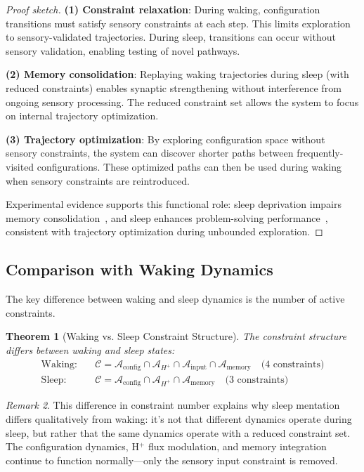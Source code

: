 \documentclass[aps,prd,twocolumn,superscriptaddress,floatfix,nofootinbib]{revtex4-2}
\newtheorem{theorem}{Theorem}[section]
\theoremstyle{remark}
\newtheorem{remark}[theorem]{Remark}
\begin{document}
\begin{proof}[Proof sketch]
\textbf{(1) Constraint relaxation}: During waking, configuration transitions must satisfy sensory constraints at each step. This limits exploration to sensory-validated trajectories. During sleep, transitions can occur without sensory validation, enabling testing of novel pathways.

\textbf{(2) Memory consolidation}: Replaying waking trajectories during sleep (with reduced constraints) enables synaptic strengthening without interference from ongoing sensory processing. The reduced constraint set allows the system to focus on internal trajectory optimization.

\textbf{(3) Trajectory optimization}: By exploring configuration space without sensory constraints, the system can discover shorter paths between frequently-visited configurations. These optimized paths can then be used during waking when sensory constraints are reintroduced.

Experimental evidence supports this functional role: sleep deprivation impairs memory consolidation~\cite{walker2009overnight}, and sleep enhances problem-solving performance~\cite{wagner2004sleep}, consistent with trajectory optimization during unbounded exploration.
\end{proof}

\subsection{Comparison with Waking Dynamics}

The key difference between waking and sleep dynamics is the number of active constraints.

\begin{theorem}[Waking vs. Sleep Constraint Structure]
\label{thm:wake_sleep}
The constraint structure differs between waking and sleep states:
\begin{align}
\text{Waking:} \quad & \mathcal{C} = \mathcal{A}_{\text{config}} \cap \mathcal{A}_{H^+} \cap \mathcal{A}_{\text{input}} \cap \mathcal{A}_{\text{memory}} \quad \text{(4 constraints)} \\
\text{Sleep:} \quad & \mathcal{C} = \mathcal{A}_{\text{config}} \cap \mathcal{A}_{H^+} \cap \mathcal{A}_{\text{memory}} \quad \text{(3 constraints)}
\end{align}
\end{theorem}

\begin{remark}
This difference in constraint number explains why sleep mentation differs qualitatively from waking: it's not that different dynamics operate during sleep, but rather that the same dynamics operate with a reduced constraint set. The configuration dynamics, H$^+$ flux modulation, and memory integration continue to function normally—only the sensory input constraint is removed.
\end{remark}
\end{document}
